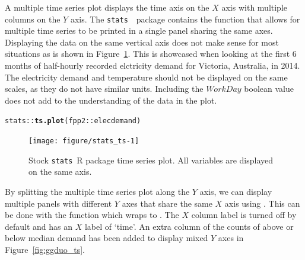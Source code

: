 \documentclass[stat,dissertation]{puthesis}\usepackage[]{graphicx}\usepackage{xcolor}
\makeatletter
\newcommand{\hlopt}[1]{\textcolor[rgb]{0,0,0}{#1}}%
\newcommand{\hlstd}[1]{\textcolor[rgb]{0.345,0.345,0.345}{#1}}%
\newcommand{\hlkwd}[1]{\textcolor[rgb]{0.737,0.353,0.396}{\textbf{#1}}}%
\newenvironment{kframe}{%
 \def\at@end@of@kframe{}%
 \ifinner\ifhmode%
  \def\at@end@of@kframe{\end{minipage}}%
  \begin{minipage}{\columnwidth}%
 \fi\fi%
 \def\FrameCommand##1{\hskip\@totalleftmargin \hskip-\fboxsep
 \colorbox{shadecolor}{##1}\hskip-\fboxsep
     \hskip-\linewidth \hskip-\@totalleftmargin \hskip\columnwidth}%
 \MakeFramed {\advance\hsize-\width
   \@totalleftmargin\z@ \linewidth\hsize
   \@setminipage}}%
 {\par\unskip\endMakeFramed%
 \at@end@of@kframe}
\newenvironment{knitrout}{}{} %
\renewenvironment{knitrout}{\setstretch{1}}{}
\newcommand{\pkg}[1]{\texttt{#1}}
\makeatother
\begin{document}
A multiple time series plot displays the time axis on the $X$ axis with multiple columns on the $Y$ axis.  The \pkg{stats}~\cite{r_project}~package contains the  function that allows for multiple time series to be printed in a single panel sharing the same axes.  Displaying the data on the same vertical axis does not make sense for most situations as is shown in Figure~\ref{fig:stats_ts}.  This is showcased when looking at the first 6 months of half-hourly recorded elctricity demand for Victoria, Australia, in 2014.  The electricity demand and temperature should not be displayed on the same scales, as they do not have similar units.  Including the $WorkDay$ boolean value does not add to the understanding of the data in the plot.

\begin{knitrout}\small
{}\color{fgcolor}\begin{kframe}
\begin{alltt}
\hlstd{stats}\hlopt{::}\hlkwd{ts.plot}\hlstd{(fpp2}\hlopt{::}\hlstd{elecdemand)}
\end{alltt}
\end{kframe}\begin{figure}[H]

{\centering \texttt{[image: figure/stats\_ts-1]} 

}

\caption{Stock \pkg{stats}~R package time series plot.  All variables are displayed on the same axis.}\label{fig:stats_ts}
\end{figure}


\end{knitrout}


By splitting the multiple time series plot along the $Y$ axis, we can display multiple panels with different $Y$ axes that share the same $X$ axis using . This can be done with the function  which wraps to .  The $X$ column label is turned off by default and has an $X$ label of `time'.  An extra column of the counts of above or below median demand has been added to display mixed $Y$ axes in Figure~\ref{fig:ggduo_ts}.
\end{document}
